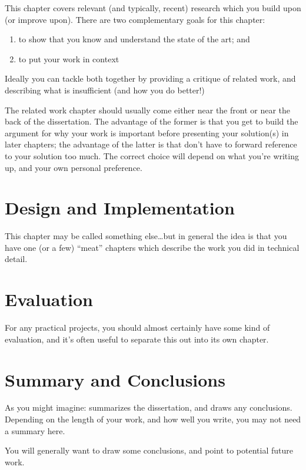\documentclass[a4paper,12pt,twoside,openright]{report}
\begin{document}
This chapter covers relevant (and typically, recent) research
which you build upon (or improve upon). There are two complementary
goals for this chapter:
\begin{enumerate}
  \item to show that you know and understand the state of the art; and
  \item to put your work in context
\end{enumerate}

Ideally you can tackle both together by providing a critique of
related work, and describing what is insufficient (and how you do
better!)

The related work chapter should usually come either near the front or
near the back of the dissertation. The advantage of the former is that
you get to build the argument for why your work is important before
presenting your solution(s) in later chapters; the advantage of the
latter is that don't have to forward reference to your solution too
much. The correct choice will depend on what you're writing up, and
your own personal preference.



\chapter{Design and Implementation}

This chapter may be called something else\ldots but in general
the idea is that you have one (or a few) ``meat'' chapters which
describe the work you did in technical detail.


\chapter{Evaluation}

For any practical projects, you should almost certainly have
some kind of evaluation, and it's often useful to separate
this out into its own chapter.


\chapter{Summary and Conclusions}

As you might imagine: summarizes the dissertation, and draws
any conclusions. Depending on the length of your work, and
how well you write, you may not need a summary here.

You will generally want to draw some conclusions, and point
to potential future work.




\appendix
\singlespacing


%
\end{document}
